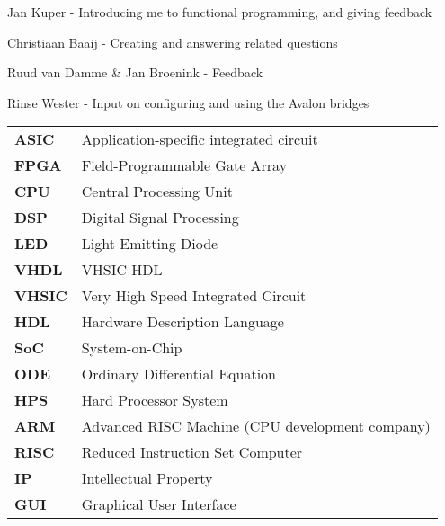
\begin{acknowledgements}      
\begin{itemizens}
	\item Jan Kuper	- Introducing me to functional programming, \clash{} and giving feedback
	\item Christiaan Baaij - Creating \clash{} and answering related questions
	\item Ruud van Damme \& Jan Broenink - Feedback
	\item Rinse Wester - Input on configuring and using the Avalon bridges
\end{itemizens}

\end{acknowledgements}


\vfill

\begin{acronyms}
\begin{tabular}{>{\bfseries}l l}
	ASIC & Application-specific integrated circuit \\
	FPGA & Field-Programmable Gate Array \\
	CPU & Central Processing Unit \\
	DSP & Digital Signal Processing \\
	LED & Light Emitting Diode \\
	VHDL & VHSIC HDL \\
	VHSIC & Very High Speed Integrated Circuit \\
	HDL & Hardware Description Language \\
	SoC & System-on-Chip \\ 
	ODE & Ordinary Differential Equation \\
	HPS & Hard Processor System \\
	ARM & Advanced RISC Machine (CPU development company) \\
	RISC & Reduced Instruction Set Computer \\
	IP & Intellectual Property \\
	GUI & Graphical User Interface \\
\end{tabular}		
\end{acronyms}    

  
